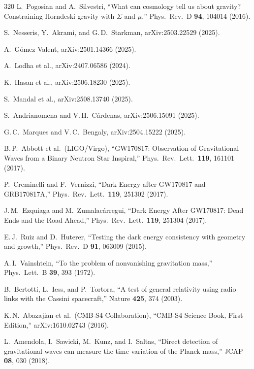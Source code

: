 \begin{thebibliography}{320}
L.\ Pogosian and A.\ Silvestri,
``What can cosmology tell us about gravity? Constraining Horndeski gravity with $\Sigma$ and $\mu$,''
Phys.\ Rev.\ D \textbf{94}, 104014 (2016).

S.\ Nesseris, Y.\ Akrami, and G.\,D.\ Starkman,
arXiv:2503.22529 (2025).

A.\ G\'omez-Valent,
arXiv:2501.14366 (2025).

A.\ Lodha et al.,
arXiv:2407.06586 (2024).

K.\ Hasan et al.,
arXiv:2506.18230 (2025).

S.\ Mandal et al.,
arXiv:2508.13740 (2025).

S.\ Andrianomena and V.\,H.\ C\'ardenas,
arXiv:2506.15091 (2025).

G.\,C.\ Marques and V.\,C.\ Bengaly,
arXiv:2504.15222 (2025).

B.\,P.\ Abbott et al.\ (LIGO/Virgo),
``GW170817: Observation of Gravitational Waves from a Binary Neutron Star Inspiral,''
Phys.\ Rev.\ Lett.\ \textbf{119}, 161101 (2017).

P.\ Creminelli and F.\ Vernizzi,
``Dark Energy after GW170817 and GRB170817A,''
Phys.\ Rev.\ Lett.\ \textbf{119}, 251302 (2017).

J.\,M.\ Ezquiaga and M.\ Zumalac\'arregui,
``Dark Energy After GW170817: Dead Ends and the Road Ahead,''
Phys.\ Rev.\ Lett.\ \textbf{119}, 251304 (2017).

E.\,J.\ Ruiz and D.\ Huterer,
``Testing the dark energy consistency with geometry and growth,''
Phys.\ Rev.\ D \textbf{91}, 063009 (2015).

A.\,I.\ Vainshtein,
``To the problem of nonvanishing gravitation mass,''
Phys.\ Lett.\ B \textbf{39}, 393 (1972).

B.\ Bertotti, L.\ Iess, and P.\ Tortora,
``A test of general relativity using radio links with the Cassini spacecraft,''
Nature \textbf{425}, 374 (2003).

K.\,N.\ Abazajian et al.\ (CMB-S4 Collaboration),
``CMB-S4 Science Book, First Edition,''
arXiv:1610.02743 (2016).

L.\ Amendola, I.\ Sawicki, M.\ Kunz, and I.\ Saltas,
``Direct detection of gravitational waves can measure the time variation of the Planck mass,''
JCAP \textbf{08}, 030 (2018).


\end{thebibliography}
